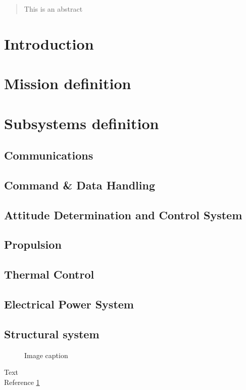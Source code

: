 \begin{abstract}
This is an abstract
\end{abstract}

\section{Introduction}

\section{Mission definition}

\section{Subsystems definition}

\subsection{Communications}

\subsection{Command & Data Handling}

\subsection{Attitude Determination and Control System}

\subsection{Propulsion}

\subsection{Thermal Control}

\subsection{Electrical Power System}

\subsection{Structural system}


\begin{figure}[h]
	\centering
	\caption[short caption]{Image caption}
	\label{fig:}
\end{figure}

Text\\

Reference \ref{fig:}\\
